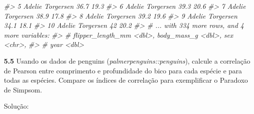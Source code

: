 \documentclass[
]{book}
\newenvironment{Shaded}{\begin{snugshade}}{\end{snugshade}}
\newcommand{\AttributeTok}[1]{\textcolor[rgb]{0.77,0.63,0.00}{#1}}
\newcommand{\CommentTok}[1]{\textcolor[rgb]{0.56,0.35,0.01}{\textit{#1}}}
\newcommand{\FunctionTok}[1]{\textcolor[rgb]{0.00,0.00,0.00}{#1}}
\newcommand{\NormalTok}[1]{#1}
\newcommand{\SpecialCharTok}[1]{\textcolor[rgb]{0.00,0.00,0.00}{#1}}
\newcommand{\StringTok}[1]{\textcolor[rgb]{0.31,0.60,0.02}{#1}}
\begin{document}
\begin{Shaded}
\begin{Highlighting}[]
\CommentTok{\#\textgreater{}  5 Adelie  Torgersen           36.7          19.3}
\CommentTok{\#\textgreater{}  6 Adelie  Torgersen           39.3          20.6}
\CommentTok{\#\textgreater{}  7 Adelie  Torgersen           38.9          17.8}
\CommentTok{\#\textgreater{}  8 Adelie  Torgersen           39.2          19.6}
\CommentTok{\#\textgreater{}  9 Adelie  Torgersen           34.1          18.1}
\CommentTok{\#\textgreater{} 10 Adelie  Torgersen           42            20.2}
\CommentTok{\#\textgreater{} \# ... with 334 more rows, and 4 more variables:}
\CommentTok{\#\textgreater{} \#   flipper\_length\_mm \textless{}dbl\textgreater{}, body\_mass\_g \textless{}dbl\textgreater{}, sex \textless{}chr\textgreater{},}
\CommentTok{\#\textgreater{} \#   year \textless{}dbl\textgreater{}}
\end{Highlighting}
\end{Shaded}

\textbf{5.5}
Usando os dados de penguins (\emph{palmerpenguins::penguins}), calcule a correlação de Pearson entre comprimento e profundidade do bico para cada espécie e para todas as espécies. Compare os índices de correlação para exemplificar o Paradoxo de Simpsom.

Solução:

\begin{Shaded}
\end{Shaded}
\end{document}
